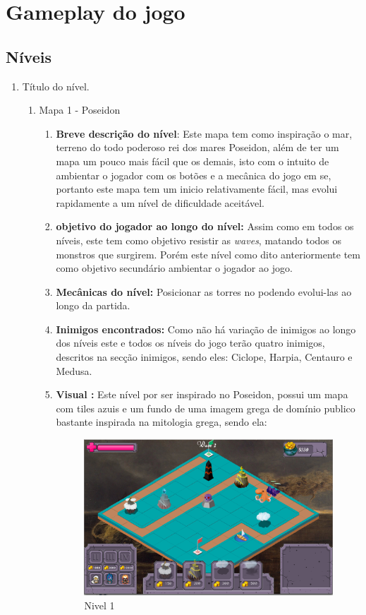 \documentclass[11pt]{article} %
\begin{document}
\newpage

\section{Gameplay do jogo}
\subsection{Níveis}

\begin{enumerate}
\item Título do nível.
	\begin{enumerate}
	\item Mapa 1 - Poseidon
		\begin{enumerate}
		\item \textbf{Breve descrição do nível}: Este mapa tem como inspiração o mar, terreno do todo poderoso rei dos mares Poseidon, além de ter um mapa um pouco mais fácil que os demais, isto com o intuito de ambientar o jogador com os botões e a mecânica do jogo em se, portanto este mapa tem um inicio relativamente fácil, mas evolui rapidamente a um nível de dificuldade aceitável.
		\item \textbf{objetivo do jogador ao longo do nível:} Assim como em todos os níveis, este tem como objetivo resistir as \textit{waves}, matando todos os monstros que surgirem. Porém este nível como dito anteriormente tem como objetivo secundário ambientar o jogador ao jogo.
		\item \textbf{Mecânicas do nível:} Posicionar as torres no podendo evolui-las ao longo da partida.
		\item \textbf{Inimigos encontrados:} Como não há variação de inimigos ao longo dos níveis este e todos os níveis do jogo terão quatro inimigos, descritos na secção inimigos, sendo eles: Ciclope, Harpia, Centauro e Medusa.
		\item \textbf{Visual :} Este nível por ser inspirado no Poseidon, possui um mapa com tiles azuis e um fundo de uma imagem grega de domínio publico bastante inspirada na mitologia grega, sendo ela:
		
			\begin{figure}[!htp]
			\centering
			\includegraphics[scale=0.3]{res/nivel1.png}
			\caption{Nivel 1}
			\label{nivel1}
			\end{figure}
			

\end{enumerate}
\end{enumerate}
\end{enumerate}
\end{document}
